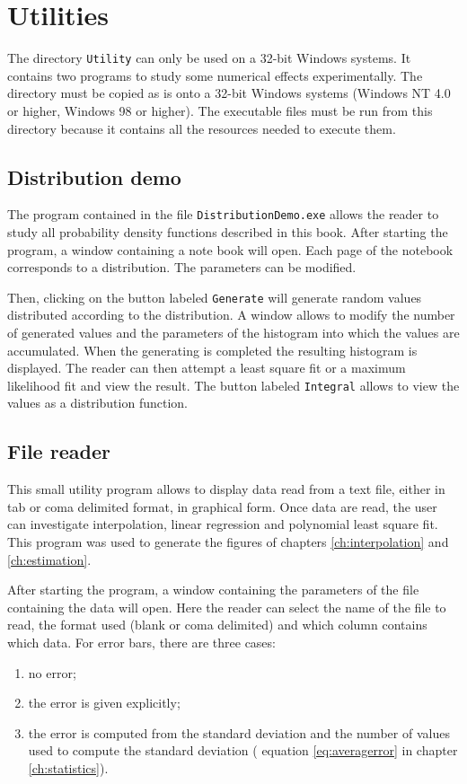 \documentclass[twoside]{book}
\begin{document}
\section{Utilities}
The directory {\tt Utility} can only be used on a 32-bit Windows
systems. It contains two programs to study some numerical effects
experimentally. The directory must be copied as is onto a 32-bit
Windows systems (Windows NT 4.0 or higher, Windows 98 or higher).
The executable files must be run from this directory because it
contains all the resources needed to execute them.

\subsection{Distribution demo}
The program contained in the file {\tt DistributionDemo.exe}
allows the reader to study all probability density functions
described in this book. After starting the program, a window
containing a note book will open. Each page of the notebook
corresponds to a distribution. The parameters can be modified.

Then, clicking on the button labeled {\tt Generate} will generate
random values distributed according to the distribution. A window
allows to modify the number of generated values and the parameters
of the histogram into which the values are accumulated. When the
generating is completed the resulting histogram is displayed. The
reader can then attempt a least square fit or a maximum likelihood
fit and view the result. The button labeled {\tt Integral} allows
to view the values as a distribution function.

\subsection{File reader}
This small utility program allows to display data read from a text
file, either in tab or coma delimited format, in graphical form.
Once data are read, the user can investigate interpolation, linear
regression and polynomial least square fit. This program was used
to generate the figures of chapters \ref{ch:interpolation} and
\ref{ch:estimation}.

After starting the program, a window containing the parameters of
the file containing the data will open. Here the reader can select
the name of the file to read, the format used (blank or coma
delimited) and which column contains which data. For error bars,
there are three cases:
\begin{enumerate}
  \item no error;
  \item the error is given explicitly;
  \item the error is computed from the standard deviation and the
  number of values used to compute the standard deviation (\cf
  equation \ref{eq:averagerror} in chapter \ref{ch:statistics}).
\end{enumerate}
\end{document}
